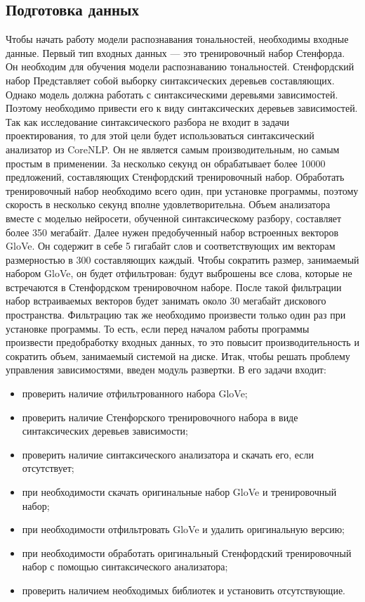 \subsection{Подготовка данных}\label{subsec:sys:data_gathering}
Чтобы начать работу модели распознавания тональностей, необходимы входные данные. Первый тип входных данных --- это тренировочный набор Стенфорда. Он необходим для обучения модели распознаванию тональностей. Стенфордский набор Представляет собой выборку синтаксических деревьев составляющих. Однако модель должна работать с синтаксическими деревьями зависимостей. Поэтому необходимо привести его к виду синтаксических деревьев зависимостей. Так как исследование синтаксического разбора не входит в задачи проектирования, то для этой цели будет использоваться синтаксический анализатор из CoreNLP\@. Он не является самым производительным, но самым простым в применении. За несколько секунд он обрабатывает более 10000 предложений, составляющих Стенфордский тренировочный набор. Обработать тренировочный набор необходимо всего один, при установке программы, поэтому скорость в несколько секунд вполне удовлетворительна. Объем анализатора вместе с моделью нейросети, обученной синтаксическому разбору, составляет более 350 мегабайт. Далее нужен предобученный набор встроенных векторов GloVe\@. Он содержит в себе 5 гигабайт слов и соответствующих им векторам размерностью в 300 составляющих каждый. Чтобы сократить размер, занимаемый набором GloVe\@, он будет отфильтрован: будут выброшены все слова, которые не встречаются в Стенфордском тренировочном наборе. После такой фильтрации набор встраиваемых векторов будет занимать около 30 мегабайт дискового пространства. Фильтрацию так же необходимо произвести только один раз при установке программы. То есть, если перед началом работы программы произвести предобработку входных данных, то это повысит производительность и сократить объем, занимаемый системой на диске. Итак, чтобы решать проблему управления зависимостями, введен модуль развертки. В его задачи входит:

\begin{itemize}
\item проверить наличие отфильтрованного набора GloVe;
\item проверить наличие Стенфорского тренировочного набора в виде синтаксических деревьев зависимости;
\item проверить наличие синтаксического анализатора и скачать его, если отсутствует;
\item при необходимости скачать оригинальные набор GloVe и тренировочный набор;
\item при необходимости отфильтровать GloVe и удалить оригинальную версию;
\item при необходимости обработать оригинальный Стенфордский тренировочный набор с помощью синтаксического анализатора;
\item проверить наличием необходимых библиотек и установить отсутствующие.
\end{itemize}

